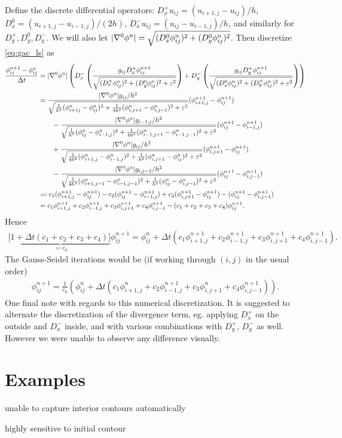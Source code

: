 Define the discrete differential operators: $D_x^+ u_{ij} = (u_{i+1,j} - u_{ij})/h$, $D^0_x = (u_{i+1,j} - u_{i-1,j})/(2h)$,
$D^-_x u_{ij} = (u_{ij} - u_{i-1,j})/h$, and similarly for $D^+_y, D^0_y, D^-_y$.  We will also let $\lvert\nabla^0 \phi^n\rvert = \sqrt{(D^0_x \phi^n_{ij})^2 + (D^0_y \phi^n_{ij})^2 } $. 
Then discretize \eqref{eq:gac_ls} as 
\begin{align*}
\frac{\phi^{n+1}_{ij} - \phi^n_{ij}}{\Delta t} 
&= \lvert\nabla^0 \phi^n\rvert
\left(
D^-_x \left( \frac{g_{ij}D^+_x \phi_{ij}^{n+1}}{\sqrt{ (D^+_x \phi^n_{ij})^2 + (D^0_y \phi^n_{ij})^2 + \varepsilon^2}}
\right) 
+ D^-_y \left(  \frac{g_{ij}D^+_y \phi_{ij}^{n+1}}{\sqrt{ (D^0_x \phi^n_{ij})^2 + (D^+_y \phi^n_{ij})^2  + \varepsilon^2}}
\right)
\right)
\\
&= 
\frac{\lvert\nabla^0 \phi^n\rvert g_{ij}/h^2 }{\sqrt{ \frac{1}{h^2}(\phi^n_{i+1j} -\phi^n_{ij} )^2 + \frac{1}{4h^2} (\phi^n_{i,j+1} - \phi^n_{i,j-1})^2 + \varepsilon^2}}
(\phi^{n+1}_{i+1,j} - \phi^{n+1}_{ij})
\\
&\qquad-\frac{\lvert\nabla^0 \phi^n\rvert g_{i-1,j}/h^2 }{\sqrt{ \frac{1}{h^2}(\phi^n_{ij} -\phi^n_{i-1,j} )^2 + \frac{1}{4h^2} (\phi^n_{i-1,j+1} - \phi^n_{i-1,j-1})^2 + \varepsilon^2}}
(\phi^{n+1}_{ij} - \phi^{n+1}_{i-1,j}) 
\\
&\qquad+\frac{\lvert\nabla^0 \phi^n\rvert g_{ij}/h^2 }{\sqrt{ \frac{1}{4h^2}(\phi^n_{i+1,j} -\phi^n_{i-1,j} )^2 + \frac{1}{h^2} (\phi^n_{i,j+1} - \phi^n_{ij})^2 + \varepsilon^2}}
(\phi^{n+1}_{i,j+1} - \phi^{n+1}_{ij}) 
\\
&\qquad-\frac{\lvert\nabla^0 \phi^n\rvert g_{i,j-1}/h^2 }{\sqrt{ \frac{1}{4h^2}(\phi^n_{i+1,j-1} -\phi^n_{i-1,j-1} )^2 + \frac{1}{h^2} (\phi^n_{ij} - \phi^n_{i,j-1})^2 + \varepsilon^2}}
(\phi^{n+1}_{ij} - \phi^{n+1}_{i,j-1}) 
\\
&\eqqcolon c_1(\phi^{n+1}_{i+1,j} - \phi^{n+1}_{ij})
- c_2(\phi^{n+1}_{ij} - \phi^{n+1}_{i-1,j}) 
+ c_3(\phi^{n+1}_{i,j+1} - \phi^{n+1}_{ij}) 
- (\phi^{n+1}_{ij} - \phi^{n+1}_{i,j-1}) 
\\
&= c_1\phi^{n+1}_{i+1,j} + c_2\phi^{n+1}_{i-1,j} + c_3\phi^{n+1}_{i,j+1} + c_4\phi^{n+1}_{i,j-1}
- (c_1 + c_2 + c_3 + c_4) \phi^{n+1}_{ij}.
\end{align*}
Hence 
\begin{align*}
\big[ 
\underbrace{1 + \Delta t (c_1 + c_2 + c_3 + c_4)
\big]}_{\eqqcolon c_0} \phi^{n+1}_{ij} 
= \phi^n_{ij} + \Delta t (c_1\phi^{n+1}_{i+1,j} + c_2\phi^{n+1}_{i-1,j} + c_3\phi^{n+1}_{i,j+1} + c_4\phi^{n+1}_{i,j-1}).
\end{align*}
The Gauss-Seidel iterations would be (if working through $(i,j)$ in the usual order)
\begin{align*}
\phi^{n+1}_{ij} 
= \frac{1}{c_0} 
\left( \phi^n_{ij} + \Delta t 
\left( c_1 \phi^n_{i+1,j} + c_2 \phi^{n+1}_{i-1,j} + c_3 \phi^{n}_{i,j+1} + c_4 \phi^{n+1}_{i,j-1}
\right)
\right).
\end{align*}
One final note with regards to this numerical discretization. It is suggested to alternate the discretization of the divergence term, eg. applying $D^+_x$ on the outside and $D^-_x$ inside, and with various combinations with $D^+_y$, $D^-_y$ as well. However we were unable to observe any difference visually.


\section{Examples} 

unable to capture interior contours automatically

highly sensitive to initial contour